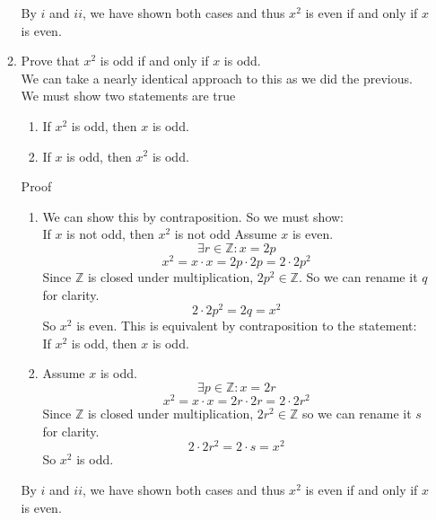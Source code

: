 \documentclass[12pt]{article}
\begin{document}
\begin{enumerate}
\begin{enumerate}
            By $i$ and $ii$, we have shown both cases and thus
            $x^2$ is even if and only if $x$ is even. \\

        \item Prove that $x^2$ is odd if and only if $x$ is odd. \\

            We can take a nearly identical approach to this as we did the previous.
            We must show two statements are true
            \begin{enumerate}
                \item If $x^2$ is odd, then $x$ is odd.
                \item If $x$ is odd, then $x^2$ is odd.
            \end{enumerate}

            Proof

            \begin{enumerate}
                \item
                    We can show this by contraposition.
                    So we must show: \\
                    If $x$ is not odd, then $x^2$ is not odd
                    Assume $x$ is even.
                    \[\exists r \in \mathbb{Z} : x = 2p\]
                    \[
                        x^2 = x \cdot x = 2p \cdot 2p = 2 \cdot 2p^2
                    \]
                    Since $\mathbb{Z}$ is closed under multiplication,
                    $2p^2 \in \mathbb{Z}$.
                    So we can rename it $q$ for clarity.
                    \[2 \cdot 2p^2 = 2q = x^2\]
                    So $x^2$ is even.
                    This is equivalent by contraposition to the statement: \\
                    If $x^2$ is odd, then $x$ is odd.

                \item
                    Assume $x$ is odd.
                    \[\exists p \in \mathbb{Z} : x = 2r\]
                    \[x^2 = x \cdot x = 2r \cdot 2r = 2 \cdot 2r^2\]
                    Since $\mathbb{Z}$ is closed under multiplication,
                    $2r^2 \in \mathbb{Z}$ so we can rename it $s$ for clarity.
                    \[2 \cdot 2r^2 = 2 \cdot s = x^2\]
                    So $x^2$ is odd.
            \end{enumerate}

            By $i$ and $ii$, we have shown both cases and thus
            $x^2$ is even if and only if $x$ is even. \\


\end{enumerate}
\end{enumerate}
\end{document}
